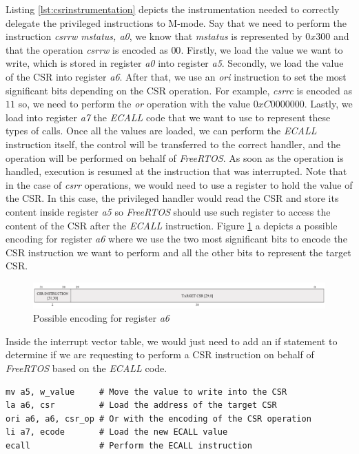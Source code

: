 Listing \ref{lst:csrinstrumentation} depicts the instrumentation needed to
correctly delegate the privileged instructions to M-mode. Say that we need to perform
the instruction \textit{csrrw mstatus, a0}, we know that \textit{mstatus} is
represented by $0x300$ and that the operation \textit{csrrw} is encoded as $00$.
Firstly, we load the value we want to write, which is stored in register \textit{a0}
into register \textit{a5}. Secondly, we load the value of the CSR into register
\textit{a6}. After that, we use an \textit{ori} instruction to set the most
significant bits depending on the CSR operation. For example, \textit{csrrc} is encoded
as $11$ so, we need to perform the \textit{or} operation with the value $0xC00000
00$. Lastly, we load into register \textit{a7} the \textit{ECALL} code that we want
to use to represent these types of calls. Once all the values are loaded, we can
perform the \textit{ECALL} instruction itself, the control will be transferred to
the correct handler, and the operation will be performed on behalf of \textit{FreeRTOS}.
As soon as the operation is handled, execution is resumed at the instruction that
was interrupted. Note that in the case of \textit{csrr} operations, we would
need to use a register to hold the value of the CSR. In this case, the
privileged handler would read the CSR and store its content inside register
\textit{a5} so \textit{FreeRTOS} should use such register to access the content
of the CSR after the \textit{ECALL} instruction. Figure \ref{fig:a6encoding} a
depicts a possible encoding for register \textit{a6} where we use the two most significant
bits to encode the CSR instruction we want to perform and all the other bits to represent
the target CSR. \\
\begin{figure}[htbp]
  \centering
  \includegraphics[width=.9\linewidth]{images/freertos_encoding.png}
  \caption{Possible encoding for register \textit{a6}}
  \label{fig:a6encoding}
\end{figure}

Inside the interrupt vector table, we would just need to add an if statement to
determine if we are requesting to perform a CSR instruction on behalf of \textit{FreeRTOS}
based on the \textit{ECALL} code. \\ \begin{lstlisting}[style=Assembly, caption = \textit{FreeRTOS} instrumentation for Control and Status Register operations, label={lst:csrinstrumentation}]
mv a5, w_value     # Move the value to write into the CSR
la a6, csr         # Load the address of the target CSR
ori a6, a6, csr_op # Or with the encoding of the CSR operation
li a7, ecode       # Load the new ECALL value
ecall              # Perform the ECALL instruction
\end{lstlisting}

